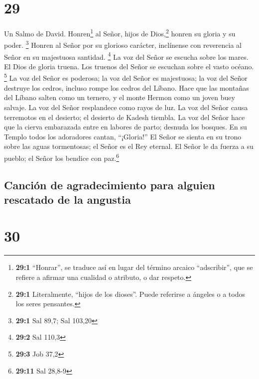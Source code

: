 \hypertarget{section-28}{%
\section{29}\label{section-28}}

Un Salmo de David.  Honren\footnote{\textbf{29:1}
  ``Honrar'', se traduce así en lugar del término arcaico ``adscribir'',
  que se refiere a afirmar una cualidad o atributo, o dar respeto.} al
Señor, hijos de Dios,\footnote{\textbf{29:1} Literalmente, ``hijos de
  los dioses''. Puede referirse a ángeles o a todos los seres pensantes.}
honren su gloria y su poder. \footnote{\textbf{29:1} Sal 89,7; Sal
  103,20}  Honren al Señor por su glorioso carácter,
inclínense con reverencia al Señor en su majestuosa santidad.
\footnote{\textbf{29:2} Sal 110,3}  La voz del Señor se
escucha sobre los mares. El Dios de gloria truena. Los truenos del Señor
se escuchan sobre el vasto océano. \footnote{\textbf{29:3} Job 37,2}
 La voz del Señor es poderosa; la voz del Señor es
majestuosa;  la voz del Señor destruye los cedros, incluso
rompe los cedros del Líbano.  Hace que las montañas del
Líbano salten como un ternero, y el monte Hermon como un joven buey
salvaje.  La voz del Señor resplandece como rayos de luz.
 La voz del Señor causa terremotos en el desierto; el
desierto de Kadesh tiembla.  La voz del Señor hace que la
cierva embarazada entre en labores de parto; desnuda los bosques. En su
Templo todos los adoradores cantan, ``¡Gloria!''  El
Señor se sienta en su trono sobre las aguas tormentosas; el Señor es el
Rey eternal.  El Señor le da fuerza a su pueblo; el Señor
los bendice con paz.\footnote{\textbf{29:11} Sal 28,8-9}

\hypertarget{canciuxf3n-de-agradecimiento-para-alguien-rescatado-de-la-angustia}{%
\subsection{Canción de agradecimiento para alguien rescatado de la
angustia}\label{canciuxf3n-de-agradecimiento-para-alguien-rescatado-de-la-angustia}}

\hypertarget{section-29}{%
\section{30}\label{section-29}}

